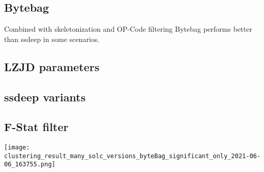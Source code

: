 \documentclass[../main.tex]{subfiles}
\begin{document}

\subsection{Bytebag}
Combined with skeletonization and OP-Code filtering Bytebag performs better than ssdeep in some scenarios.

\subsection{LZJD parameters}



\subsection{ssdeep variants}

\subsection{F-Stat filter}

\texttt{[image: clustering\_result\_many\_solc\_versions\_byteBag\_significant\_only\_2021-06-06\_163755.png]}
\end{document}
